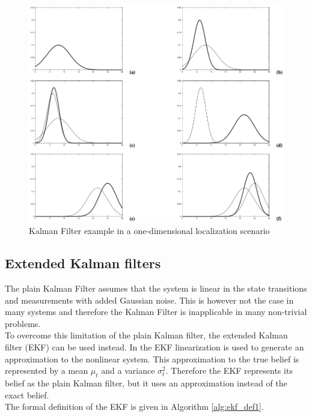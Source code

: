\begin{figure}[H]
\centering
\includegraphics[scale=0.45]{images/KalmanFilterExample}
\caption{Kalman Filter example in a one-dimensional localization scenario}
\label{fig:kf_ex}
\end{figure}

\subsection{Extended Kalman filters}

The plain Kalman Filter assumes that the system is linear in the state transitions and measurements with added Gaussian noise. This is however not the case in many systems and therefore the Kalman Filter is inapplicable in many non-trivial problems.\\

To overcome this limitation of the plain Kalman filter, the extended Kalman filter (EKF) can be used instead. In the EKF linearization is used to generate an approximation to the nonlinear system. This approximation to the true belief is represented by a mean $\mu_t$ and a variance $\sigma_t^2$. Therefore the EKF represents its belief as the plain Kalman filter, but it uses an approximation instead of the exact belief.\\

The formal definition of the EKF is given in Algorithm \ref{alg:ekf_def1}.

